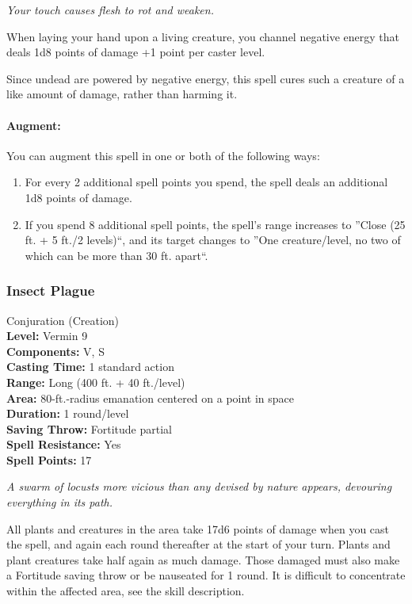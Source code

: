 \emph{Your touch causes flesh to rot and weaken.}

When laying your hand upon a living creature, you channel negative energy that deals 1d8 points of damage +1 point per caster level.

Since undead are powered by negative energy, this spell cures such a creature of a like amount of damage, rather than harming it.

\paragraph{Augment:} You can augment this spell in one or both of the following ways:
\begin{enumerate}
 \item For every 2 additional spell points you spend, the spell deals an additional 1d8 points of damage.
 \item If you spend 8 additional spell points, the spell's range increases to ''Close (25 ft. + 5 ft./2 levels)``, 
and its target changes to ''One creature/level, no two of which can be more than 30 ft. apart``.
\end{enumerate}
\subsubsection{Insect Plague}
\label{Spell:InsectPlague}
Conjuration (Creation)
\\ \textbf{Level:} Vermin 9
\\ \textbf{Components:} V, S
\\ \textbf{Casting Time:} 1 standard action
\\ \textbf{Range:} Long (400 ft. + 40 ft./level)
\\ \textbf{Area:} 80-ft.-radius emanation centered on a point in space
\\ \textbf{Duration:} 1 round/level
\\ \textbf{Saving Throw:} Fortitude partial
\\ \textbf{Spell Resistance:} Yes
\\ \textbf{Spell Points:} 17

\emph{A swarm of locusts more vicious than any devised by nature appears, devouring everything in its path.}

All plants and creatures in the area take 17d6 points of damage when you cast the spell, and again each round thereafter at the start of your turn.
Plants and plant creatures take half again as much damage.
Those damaged must also make a Fortitude saving throw or be nauseated for 1 round.
It is difficult to concentrate within the affected area, see the  skill description.

